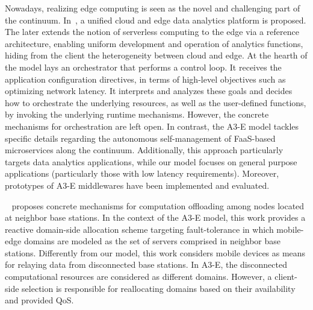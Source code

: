 Nowadays, realizing edge computing is seen as the novel and challenging part of the continuum. In~\cite{Nastic17ServerlessDataAnalytics}, a unified cloud and edge data analytics platform is proposed. The later extends the notion of serverless computing to the edge via a reference architecture, enabling uniform development and operation of analytics functions, hiding from the client the heterogeneity between cloud and edge. At the hearth of the model lays an orchestrator that performs a control loop. It receives the application configuration directives, in terms of high-level objectives such as optimizing network latency. It interprets and analyzes these goals and decides how to orchestrate the
underlying resources, as well as the user-defined functions, by invoking
the underlying runtime mechanisms. However, the concrete mechanisms for orchestration are left open. In contrast, the A3-E model tackles specific details regarding the autonomous self-management of FaaS-based microservices along the continuum. Additionally, this approach particularly targets data analytics applications, while our model focuses on general purpose applications (particularly those with low latency requirements). Moreover, prototypes of A3-E middlewares have been implemented and evaluated. 



~\cite{Satria2017mec} proposes concrete mechanisms for computation offloading among nodes located at neighbor base stations. In the context of the A3-E model, this work provides a reactive domain-side allocation scheme targeting fault-tolerance in which mobile-edge domains are modeled as the set of servers comprised in neighbor base stations. Differently from our model, this work considers mobile devices as means for relaying data from disconnected base stations. In A3-E, the disconnected computational resources are considered as different domains. However, a client-side selection is responsible for reallocating domains based on their availability and provided QoS. 


